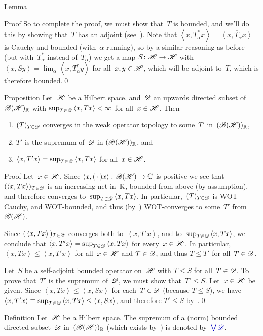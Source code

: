 \documentclass[a]{subfiles}
\begin{document}
\begin{parsec}
\begin{point}{Lemma}
\begin{point}{Proof}
So to complete the proof,
we must show that~$T$ is bounded,
and we'll do this by showing that~$T$ has an adjoint
(see~).
Note that $\left<x,T_\alpha^* x\right>=\overline{\left<x,T_\alpha x\right>}$
is Cauchy and bounded (with~$\alpha$ running),
so by a similar reasoning as before (but with~$T^*_\alpha$
instead of~$T_\alpha$)
we get a map
$S\colon \mathscr{H}\to\mathscr{H}$
with $\left<x,Sy\right>=\lim_\alpha \left<x,T^*_\alpha y\right>$
for all~$x,y\in\mathscr{H}$, which will be adjoint to~$T$,
which is therefore bounded.\qed
\end{point}
\end{point}
\begin{point}{Proposition}%
Let~$\mathscr{H}$ be a Hilbert space,
and~$\mathscr{D}$ an upwards directed subset of~$\mathscr{B}(\mathscr{H})_{\mathbb{R}}$
with $\sup_{T\in \mathscr{D}} \left<x,Tx\right> <\infty$
for all~$x\in \mathscr{H}$. Then
\begin{enumerate}
\item
$(T)_{T\in\mathscr{D}}$
converges 
in the weak operator topology
to some~$T'$ in~$(\mathscr{B}(\mathscr{H}))_{\mathbb{R}}$,
\item
$T'$ is the supremum of~$\mathscr{D}$
in $(\mathscr{B}(\mathscr{H}))_{\mathbb{R}}$,
and 
\item
$\left<x,T'x\right> = 
\sup_{T\in\mathscr{D}}\left<x,Tx\right> $
for all~$x\in \mathscr{H}$.
\end{enumerate}
\begin{point}{Proof}%
Let~$x\in \mathscr{H}$.
Since $\left<x,(\,\cdot\,)x\right>\colon \mathscr{B}(\mathscr{H})\to \mathbb{C}$
is positive
we see that
$(\left<x,Tx\right>)_{T\in\mathscr{D}}$
is an increasing net in~$\mathbb{R}$, 
bounded from above (by assumption),
and therefore converges to~$\sup_{T\in\mathscr{D}}\left<x,Tx\right>$.
In particular,~$(T)_{T\in\mathscr{D}}$
is WOT-Cauchy,
and WOT-bounded,
and thus
(by~)
WOT-converges to some~$T'$ from~$\mathscr{B}(\mathscr{H})$.

Since $(\,\left<x,Tx\right>\,)_{T\in\mathscr{D}}$
converges both to~$\left<x,T'x\right>$,
and to~$\sup_{T\in\mathscr{D}} \left<x,Tx\right>$,
we conclude that $\left<x,T'x\right>=\sup_{T\in\mathscr{D}}\left<x,Tx\right>$
for every~$x\in\mathscr{H}$.
In particular,  $\left<x,Tx\right>\leq \left<x,T'x\right>$
for all~$x\in\mathscr{H}$ and $T\in\mathscr{D}$, and thus $T\leq T'$
for all~$T\in\mathscr{D}$.

Let~$S$ be a self-adjoint bounded operator on~$\mathscr{H}$ with $T\leq S$
for all~$T\in\mathscr{D}$.
To prove that~$T'$ is the supremum of~$\mathscr{D}$,
we must show that~$T'\leq S$.
Let~$x\in \mathscr{H}$ be given.
Since $\left<x,Tx\right>\leq \left<x,Sx\right>$
for each~$T\in \mathscr{D}$ (because $T\leq S$),
we have $\left<x,T'x\right>\equiv \sup_{T\in\mathscr{D}} \left<x,Tx\right>
\leq \left<x,Sx\right>$,
and therefore $T'\leq S$ by~.\qed
\end{point}
\end{point}
\begin{point}{Definition}%
Let~$\mathscr{H}$ be a Hilbert space.
The supremum of a (norm) bounded directed subset~$\mathscr{D}$ 
in~$(\mathscr{B}(\mathscr{H}))_{\mathbb{R}}$
(which exists by~)
is denoted by~$\Define{\bigvee\scrD}$.
\end{point}
\end{parsec}
\end{document}
